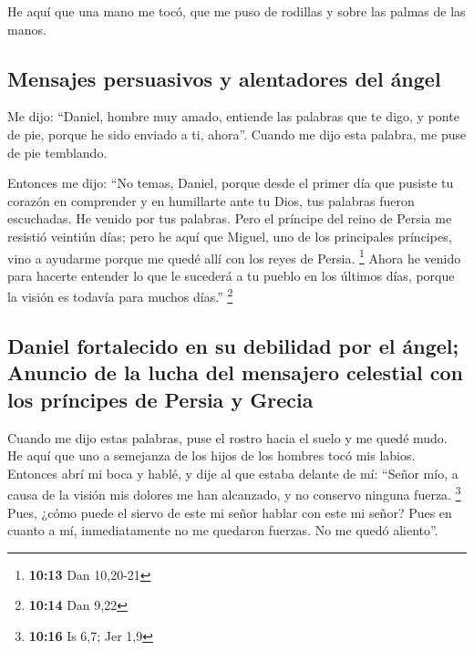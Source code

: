 \begin{paracol}{2}
 He aquí que una mano me tocó, que me puso de rodillas y
sobre las palmas de las manos.

\hypertarget{mensajes-persuasivos-y-alentadores-del-uxe1ngel}{%
\subsection{Mensajes persuasivos y alentadores del
ángel}\label{mensajes-persuasivos-y-alentadores-del-uxe1ngel}}

 Me dijo: ``Daniel, hombre muy amado, entiende las
palabras que te digo, y ponte de pie, porque he sido enviado a ti,
ahora''. Cuando me dijo esta palabra, me puse de pie temblando.

 Entonces me dijo: ``No temas, Daniel, porque desde el
primer día que pusiste tu corazón en comprender y en humillarte ante tu
Dios, tus palabras fueron escuchadas. He venido por tus palabras.
 Pero el príncipe del reino de Persia me resistió
veintiún días; pero he aquí que Miguel, uno de los principales
príncipes, vino a ayudarme porque me quedé allí con los reyes de Persia.
\footnote{\textbf{10:13} Dan 10,20-21}  Ahora he venido
para hacerte entender lo que le sucederá a tu pueblo en los últimos
días, porque la visión es todavía para muchos días.'' \footnote{\textbf{10:14}
  Dan 9,22}

\hypertarget{daniel-fortalecido-en-su-debilidad-por-el-uxe1ngel-anuncio-de-la-lucha-del-mensajero-celestial-con-los-pruxedncipes-de-persia-y-grecia}{%
\subsection{Daniel fortalecido en su debilidad por el ángel; Anuncio de
la lucha del mensajero celestial con los príncipes de Persia y
Grecia}\label{daniel-fortalecido-en-su-debilidad-por-el-uxe1ngel-anuncio-de-la-lucha-del-mensajero-celestial-con-los-pruxedncipes-de-persia-y-grecia}}

 Cuando me dijo estas palabras, puse el rostro hacia el
suelo y me quedé mudo.  He aquí que uno a semejanza de
los hijos de los hombres tocó mis labios. Entonces abrí mi boca y hablé,
y dije al que estaba delante de mí: ``Señor mío, a causa de la visión
mis dolores me han alcanzado, y no conservo ninguna fuerza. \footnote{\textbf{10:16}
  Is 6,7; Jer 1,9}  Pues, ¿cómo puede el siervo de este
mi señor hablar con este mi señor? Pues en cuanto a mí, inmediatamente
no me quedaron fuerzas. No me quedó aliento''.


\end{paracol}
